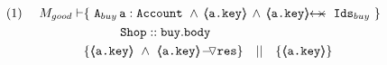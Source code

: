 \label{s:buy:sat}

\begin{lemma}
\label{l:buy:sat}
 
\begin{align*}
\text{(1)}  \ \ \ \ M_{good} \vdash 
		&	\{  \ \Alocals\,\prg{a}:\prg{Account}\ \wedge\, {\inside{\prg{a.key}}} \, \wedge \, \protectedFrom {\prg{a.key}} {\Ids}  \  \} \\
		& \SPT \prg{Shop}::\prg{buy}.\prg{body}\ \\  
		& \{ {\inside{\prg{a.key}}}\ \wedge\ {\PushASLong {\prg{res}} {\inside{\prg{a.key}}}}  \} \ \ \  || \ \ \ 
		   \{ {\inside{\prg{a.key}}} \}
\end{align*}

\end{lemma}

